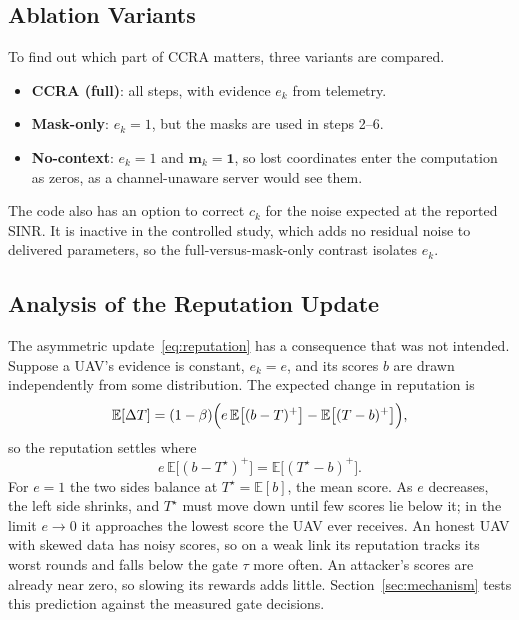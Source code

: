 \subsection{Ablation Variants}
To find out which part of CCRA matters, three variants are compared.
\begin{itemize}
\item \textbf{CCRA (full)}: all steps, with evidence $e_k$ from telemetry.
\item \textbf{Mask-only}: $e_k=1$, but the masks are used in steps 2--6.
\item \textbf{No-context}: $e_k=1$ and $\mathbf{m}_k=\mathbf{1}$, so lost
  coordinates enter the computation as zeros, as a channel-unaware server would see
  them.
\end{itemize}
The code also has an option to correct $c_k$ for the noise expected at the
reported SINR. It is inactive in the controlled study, which adds no residual noise
to delivered parameters, so the full-versus-mask-only contrast isolates $e_k$.

\subsection{Analysis of the Reputation Update}
\label{sec:fixed-point}
The asymmetric update~\eqref{eq:reputation} has a consequence that was not intended.
Suppose a UAV's evidence is constant, $e_k=e$, and its scores $b$ are drawn
independently from some distribution. The expected change in reputation is
\begin{equation}
  \mathbb{E}[\Delta T] = (1-\beta)\Bigl(e\,\mathbb{E}\bigl[(b-T)^+\bigr]
                        - \mathbb{E}\bigl[(T-b)^+\bigr]\Bigr),
\end{equation}
so the reputation settles where
\begin{equation}
  e\,\mathbb{E}\bigl[(b-T^\star)^+\bigr] = \mathbb{E}\bigl[(T^\star-b)^+\bigr].
  \label{eq:fixed-point}
\end{equation}
For $e=1$ the two sides balance at $T^\star=\mathbb{E}[b]$, the mean score. As $e$
decreases, the left side shrinks, and $T^\star$ must move down until few scores lie
below it; in the limit $e\to0$ it approaches the lowest score the UAV ever receives.
An honest UAV with skewed data has noisy scores, so on a weak link its reputation
tracks its worst rounds and falls below the gate $\tau$ more often. An attacker's
scores are already near zero, so slowing its rewards adds little. Section~\ref{sec:mechanism}
tests this prediction against the measured gate decisions.

